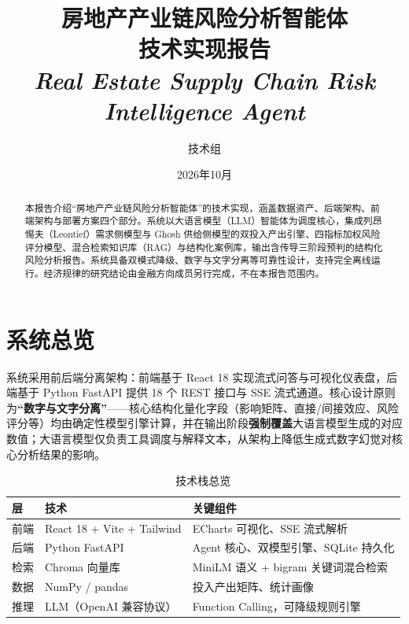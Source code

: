 \documentclass[12pt, a4paper]{ctexart}
\title{%
  \vspace{-1cm}
  {\Large 房地产产业链风险分析智能体}\\[0.3em]
  {\LARGE\bfseries 技术实现报告}\\[0.5em]
  {\small\textit{Real Estate Supply Chain Risk Intelligence Agent}}}
\author{技术组}
\date{2026年10月}
\begin{document}
\maketitle
\thispagestyle{empty}

\begin{abstract}
本报告介绍``房地产产业链风险分析智能体''的技术实现，涵盖数据资产、后端架构、前端架构与部署方案四个部分。系统以大语言模型（LLM）智能体为调度核心，集成列昂惕夫（Leontief）需求侧模型与 Ghosh 供给侧模型的双投入产出引擎、四指标加权风险评分模型、混合检索知识库（RAG）与结构化案例库，输出含传导三阶段预判的结构化风险分析报告。系统具备双模式降级、数字与文字分离等可靠性设计，支持完全离线运行。经济规律的研究结论由金融方向成员另行完成，不在本报告范围内。
\end{abstract}

\newpage
\tableofcontents
\newpage

\section{系统总览}

系统采用前后端分离架构：前端基于 React 18 实现流式问答与可视化仪表盘，后端基于 Python FastAPI 提供 18 个 REST 接口与 SSE 流式通道。核心设计原则为\textbf{``数字与文字分离''}——核心结构化量化字段（影响矩阵、直接/间接效应、风险评分等）均由确定性模型引擎计算，并在输出阶段\textbf{强制覆盖}大语言模型生成的对应数值；大语言模型仅负责工具调度与解释文本，从架构上降低生成式数字幻觉对核心分析结果的影响。

\begin{table}[htbp]
\centering
\caption{技术栈总览}
\begin{tabular}{@{}p{1.5cm}p{5.5cm}p{7.5cm}@{}}
\toprule
层 & 技术 & 关键组件 \\
\midrule
前端 & React 18 + Vite + Tailwind & ECharts 可视化、SSE 流式解析 \\
后端 & Python FastAPI & Agent 核心、双模型引擎、SQLite 持久化 \\
检索 & Chroma 向量库 & MiniLM 语义 + bigram 关键词混合检索 \\
数据 & NumPy / pandas & 投入产出矩阵、统计画像 \\
推理 & LLM（OpenAI 兼容协议） & Function Calling，可降级规则引擎 \\
\bottomrule
\end{tabular}
\end{table}

\end{document}
